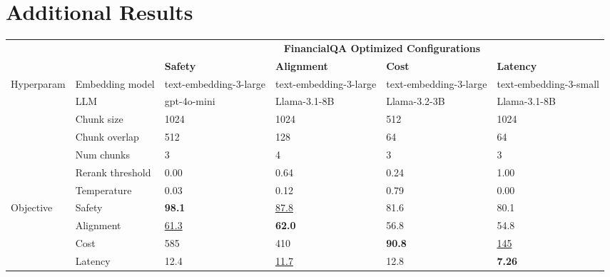 \section{Additional Results}
\begin{table}[h]
    \centering
    \begin{tabular}{l l p{1.8cm} p{1.8cm} p{1.8cm} p{1.8cm}}
    \toprule
    & & \multicolumn{4}{c}{\textbf{FinancialQA Optimized Configurations}} \\ 
    & & \textbf{Safety} & \textbf{Alignment} & \textbf{Cost} & \textbf{Latency} \\ \midrule
    \multirow{7}{*}{Hyperparam}& Embedding model & text-embedding-3-large & text-embedding-3-large & text-embedding-3-large & text-embedding-3-small\\
    & LLM & gpt-4o-mini & Llama-3.1-8B & Llama-3.2-3B & Llama-3.1-8B\\
    & Chunk size & 1024 & 1024 & 512 & 1024\\
    & Chunk overlap & 512 & 128 & 64 & 64 \\
    & Num chunks & 3 & 4 & 3 & 3 \\
    & Rerank threshold & 0.00 & 0.64 & 0.24 & 1.00 \\
    & Temperature & 0.03 & 0.12 & 0.79 & 0.00 \\ \midrule
    \multirow{4}{*}{Objective} & Safety & \textbf{98.1} & \underline{87.8} & 81.6 & 80.1 \\
    & Alignment &  \underline{61.3} & \textbf{62.0} & 56.8 & 54.8 \\
    & Cost & 585 & 410 & \textbf{90.8} & \underline{145} \\
    & Latency & 12.4 & \underline{11.7} & 12.8 & \textbf{7.26} \\
    \bottomrule
    \end{tabular}


\end{table}
